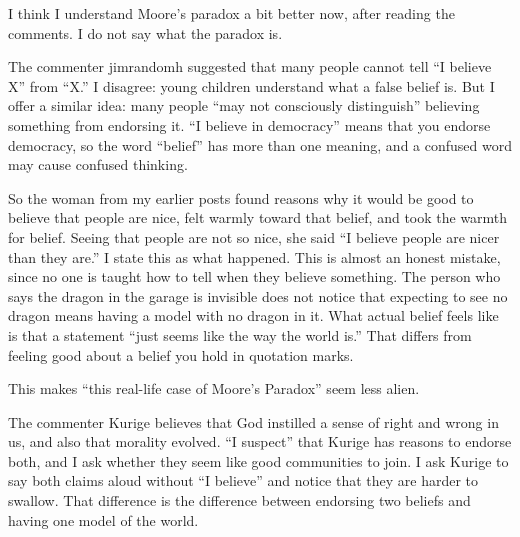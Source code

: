 
I think I understand Moore's paradox a bit better now, after reading the comments. I do not say what the paradox is. 

The commenter jimrandomh suggested that many people cannot tell ``I believe X'' from ``X.'' I disagree: young children understand what a false belief is.  But I offer a similar idea: many people ``may not consciously distinguish'' believing something from endorsing it. ``I believe in democracy'' means that you endorse democracy, so the word ``belief'' has more than one meaning, and a confused word may cause confused thinking.

So the woman from my earlier posts found reasons why it would be good to believe that people are nice, felt warmly toward that belief, and took the warmth for belief. Seeing that people are not so nice, she said ``I believe people are nicer than they are.'' I state this as what happened.  This is almost an honest mistake, since no one is taught how to tell when they believe something. The person who says the dragon in the garage is invisible does not notice that expecting to see no dragon means having a model with no dragon in it. What actual belief feels like is that a statement ``just seems like the way the world is.'' That differs from feeling good about a belief you hold in quotation marks.

This makes ``this real-life case of Moore's Paradox'' seem less alien. 

The commenter Kurige believes that God instilled a sense of right and wrong in us, and also that morality evolved. ``I suspect'' that Kurige has reasons to endorse both, and I ask whether they seem like good communities to join.  I ask Kurige to say both claims aloud without ``I believe'' and notice that they are harder to swallow. That difference is the difference between endorsing two beliefs and having one model of the world. 
